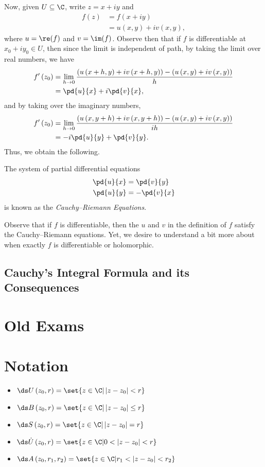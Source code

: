 \documentclass[10pt]{mypackage}
\begin{document}
Now, given $U\subseteq \C$, write $z = x + iy$ and
\begin{align*}
  f\left( z \right) &= f\left( x + iy \right)\\
                    &= u\left( x,y \right) + iv\left( x,y \right),
\end{align*}
where $u = \re(f)$ and $v = \im(f)$. Observe then that if $f$ is differentiable at $x_0 + iy_0\in U$, then since the limit is independent of path, by taking the limit over real numbers, we have
\begin{align*}
  f'\left( z_0 \right) &= \lim_{h\rightarrow 0} \frac{\left( u\left( x + h,y \right) + iv\left( x + h,y \right) \right) - \left( u\left( x,y \right) + iv\left( x,y \right) \right)}{ h }\\
                       &= \pd{u}{x} + i \pd{v}{x},
\end{align*}
and by taking over the imaginary numbers,
\begin{align*}
  f'\left( z_0 \right) &= \lim_{h\rightarrow 0} \frac{\left( u\left( x,y+h \right) + iv\left( x,y+h \right) \right) - \left( u\left( x,y \right) + iv\left( x,y \right) \right)}{ih}\\
                       &= -i \pd{u}{y} + \pd{v}{y}.
\end{align*}
Thus, we obtain the following.
\begin{definition}
  The system of partial differential equations
  \begin{align*}
    \pd{u}{x} &= \pd{v}{y}\\
    \pd{u}{y} &= - \pd{v}{x}
  \end{align*}
  is known as the \textit{Cauchy--Riemann Equations}.
\end{definition}
Observe that if $f$ is differentiable, then the $u$ and $v$ in the definition of $f$ satisfy the Cauchy--Riemann equations. Yet, we desire to understand a bit more about when exactly $f$ is differentiable or holomorphic.
\subsection{Cauchy's Integral Formula and its Consequences}%

\section{Old Exams}%
\section{Notation}%
\begin{itemize}
  \item $\ds U\left( z_0,r \right) = \set{z\in \C | \left\vert z-z_0 \right\vert < r}$
  \item $\ds B\left( z_0,r \right) = \set{z\in \C | \left\vert z-z_0 \right\vert \leq r}$
  \item $\ds S\left( z_0,r \right) = \set{z\in \C | \left\vert z-z_0 \right\vert = r}$
  \item $\ds \dot{U}\left( z_0,r \right) = \set{z\in \C | 0 < \left\vert z-z_0 \right\vert < r}$
  \item $\ds A\left( z_0,r_1,r_2 \right) = \set{z\in \C | r_1 < \left\vert z-z_0 \right\vert < r_2}$
\end{itemize}
\end{document}

